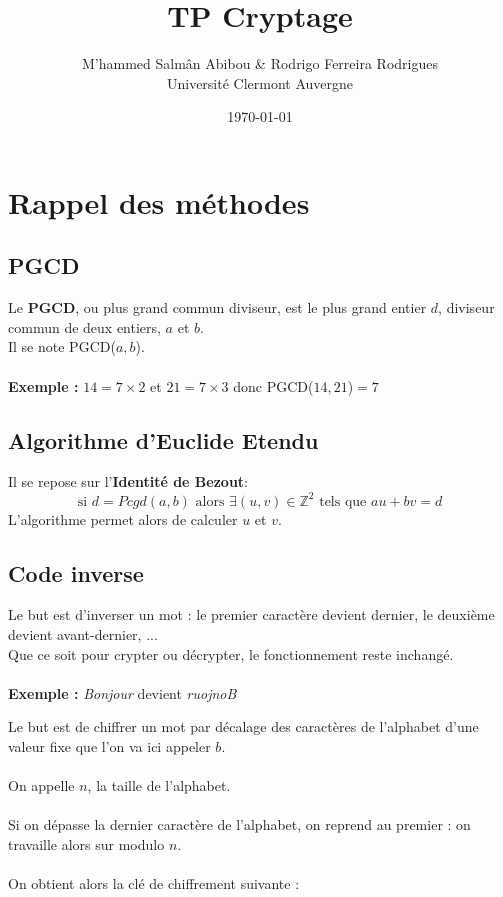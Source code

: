 \documentclass[12pt,french,titlepage]{article}
\title{TP Cryptage}
\author{M'hammed Salmân Abibou \& Rodrigo Ferreira Rodrigues \\
Université Clermont Auvergne\\}
\date{\today}
\begin{document}
	\maketitle


	\tableofcontents
	\newpage
	
	\section{Rappel des méthodes}
	
	\subsection{PGCD}
	
	Le \textbf{PGCD}, ou  plus grand commun diviseur, est le plus grand entier $d$, diviseur commun de deux entiers, $a$ et $b$.\\
	Il se note PGCD($a,b$).\\
	\\
	\textbf{Exemple : }$14 = 7\times2$ et $21 = 7\times3$ donc PGCD($14,21$)$ = 7$
	
	\subsection{Algorithme d'Euclide Etendu}
	
	Il se repose sur l'\textbf{Identité de Bezout}:\\
	\begin{equation}
	\text{si } d=Pcgd(a,b) \text{ alors } \exists (u,v)\in \mathbb{Z}^2 \text{ tels que }au+bv=d
	\end{equation}
	L'algorithme permet alors de calculer $u$ et $v$.
	\subsection{Code inverse}
	
	Le but est d'inverser un mot : le premier caractère devient dernier, le deuxième devient avant-dernier, ...\\
	Que ce soit pour crypter ou décrypter, le fonctionnement reste inchangé.\\
	\\
	\textbf{Exemple : }\textit{Bonjour} devient \textit{ruojnoB}
	
		Le but est de chiffrer un mot par décalage des caractères de l'alphabet d'une valeur fixe que l'on va ici appeler $b$.\\
	\\
	On appelle $n$, la taille de l'alphabet.\\
	\\
	Si on dépasse la dernier caractère de l'alphabet, on reprend au premier : on travaille alors sur modulo $n$.\\
	\\
	On obtient alors la clé de chiffrement suivante :\\
	
\end{document}
